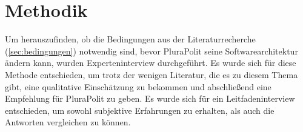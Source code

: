 \section{Methodik}
\label{sec:methodik}


Um herauszufinden, ob die Bedingungen aus der Literaturrecherche (\cref{sec:bedingungen}) notwendig sind, bevor PluraPolit seine Softwarearchitektur ändern kann, wurden Experteninterview durchgeführt. Es wurde sich für diese Methode entschieden, um trotz der wenigen Literatur, die es zu diesem Thema gibt, eine qualitative Einschätzung zu bekommen und abschließend eine Empfehlung für PluraPolit zu geben. Es wurde sich für ein Leitfadeninterview entschieden, um sowohl subjektive Erfahrungen zu erhalten, als auch die Antworten vergleichen zu können.









